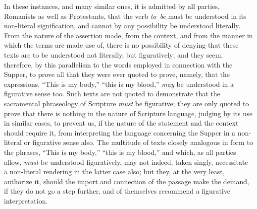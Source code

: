 \documentclass[
]{book}
\begin{document}
In these instances, and many similar ones, it is admitted by all parties, Romanists as well as Protestants, that the verb \emph{to~be} must be understood in its non-literal signification, and cannot by any possibility be understood literally. From the nature of the assertion made, from the context, and from the manner in which the terms are made use of, there is no possibility of denying that these texts are to be understood not literally, but figuratively; and they seem, therefore, by this parallelism to the words employed in connection with the Supper, to prove all that they were ever quoted to prove, namely, that the expressions, ``This is my body,'' ``this is my blood,'' \emph{may} be understood in a figurative sense too. Such texts are not quoted to demonstrate that the sacramental phraseology of Scripture \emph{must} be figurative; they are only quoted to prove that there is nothing in the nature of Scripture language, judging by its use in similar cases, to prevent us, if the nature of the statement and the context should require it, from interpreting the language concerning the Supper in a non-literal or figurative sense also. The multitude of texts closely analogous in form to the phrases, ``This is my body,'' ``this is my blood,'' and which, as all parties allow, \emph{must} be understood figuratively, may not indeed, taken singly, necessitate a non-literal rendering in the latter case also; but they, at the very least, authorize it, should the import and connection of the passage make the demand, if they do not go a step further, and of themselves recommend a figurative interpretation.
\end{document}
